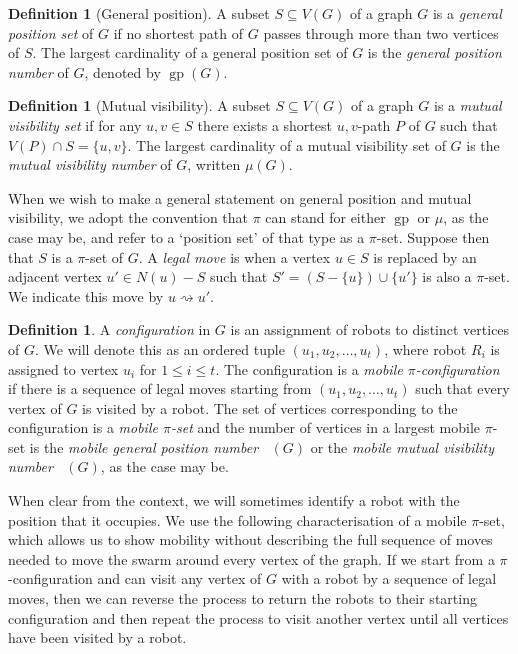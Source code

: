 \documentclass[a4paper,12pt]{article}
\DeclareMathOperator{\mob}{Mob_{gp}}
\DeclareMathOperator{\mobmv}{Mob_{\mu}}
\DeclareMathOperator{\gp}{gp}
\theoremstyle{definition}
\newtheorem{definition}[theorem]{Definition}
\newcommand{\move}{\rightsquigarrow}
\begin{document}
	\begin{definition}[General position]
		A subset $S \subseteq V(G)$ of a graph $G$ is a \emph{general position set} of $G$ if no shortest path of $G$ passes through more than two vertices of $S$. The largest cardinality of a general position set of $G$ is the \emph{general position number} of $G$, denoted by $\gp (G)$.
	\end{definition}
	
	\begin{definition}[Mutual visibility]
		A subset $S \subseteq V(G)$ of a graph $G$ is a \emph{mutual visibility set} if for any $u,v \in S$ there exists a shortest $u,v$-path $P$ of $G$ such that $V(P) \cap S = \{ u,v\} $. The largest cardinality of a mutual visibility set of $G$ is the \emph{mutual visibility number} of $G$, written $\mu (G)$.
	\end{definition}
	
	When we wish to make a general statement on general position and mutual visibility, we adopt the convention that $\pi $ can stand for either $\gp $ or $\mu $, as the case may be, and refer to a `position set' of that type as a $\pi $-set. Suppose then that $S$ is a $\pi $-set of $G$. A \emph{legal move} is when a vertex $u \in S$ is replaced by an adjacent vertex $u' \in N(u)-S$ such that $S' = (S - \{ u\} ) \cup \{ u'\} $ is also a $\pi $-set. We indicate this move by $u \move u'$. %
	
	\begin{definition}
		A \emph{configuration} in $G$ is an assignment of robots to distinct vertices of $G$. We will denote this as an ordered tuple $(u_1,u_2,\dots ,u_t)$, where robot $R_i$ is assigned to vertex $u_i$ for $1 \leq i \leq t$. The configuration is a \emph{mobile $\pi $-configuration} if there is a sequence of legal moves starting from $(u_1,u_2,\dots ,u_t)$ such that every vertex of $G$ is visited by a robot. The set of vertices corresponding to the configuration is a \emph{mobile $\pi $-set} and the number of vertices in a largest mobile $\pi $-set is the \emph{mobile general position number} $\mob (G)$ or the \emph{mobile mutual visibility number} $\mobmv (G)$, as the case may be.
	\end{definition}
	
	
	When clear from the context, we will sometimes identify a robot with the position that it occupies. We use the following characterisation of a mobile $\pi $-set, which allows us to show mobility without describing the full sequence of moves needed to move the swarm around every vertex of the graph. If we start from a $\pi $-configuration and can visit any vertex of $G$ with a robot by a sequence of legal moves, then we can reverse the process to return the robots to their starting configuration and then repeat the process to visit another vertex until all vertices have been visited by a robot.
	
\end{document}
